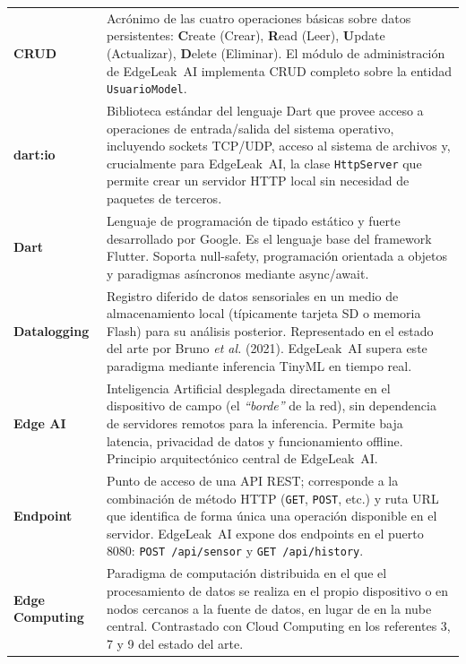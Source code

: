 \documentclass[12pt,a4paper]{article}
\begin{document}
\begin{longtable}{>{\bfseries}p{3.8cm} p{10.5cm}}
CRUD & Acrónimo de las cuatro operaciones básicas sobre datos persistentes:
\textbf{C}reate (Crear), \textbf{R}ead (Leer), \textbf{U}pdate (Actualizar),
\textbf{D}elete (Eliminar). El módulo de administración de EdgeLeak~AI implementa
CRUD completo sobre la entidad \texttt{UsuarioModel}.
\\[0.5em]

dart:io & Biblioteca estándar del lenguaje Dart que provee acceso a operaciones de
entrada/salida del sistema operativo, incluyendo sockets TCP/UDP, acceso al sistema de
archivos y, crucialmente para EdgeLeak~AI, la clase \texttt{HttpServer} que permite
crear un servidor HTTP local sin necesidad de paquetes de terceros.
\\[0.5em]

Dart & Lenguaje de programación de tipado estático y fuerte desarrollado por Google.
Es el lenguaje base del framework Flutter. Soporta null-safety, programación orientada
a objetos y paradigmas asíncronos mediante async/await.
\\[0.5em]

Datalogging & Registro diferido de datos sensoriales en un medio de almacenamiento local
(típicamente tarjeta SD o memoria Flash) para su análisis posterior. Representado en el
estado del arte por Bruno \textit{et al.} (2021). EdgeLeak~AI supera este paradigma
mediante inferencia TinyML en tiempo real.
\\[0.5em]

Edge AI & Inteligencia Artificial desplegada directamente en el dispositivo de campo
(el \textit{``borde''} de la red), sin dependencia de servidores remotos para la
inferencia. Permite baja latencia, privacidad de datos y funcionamiento offline.
Principio arquitectónico central de EdgeLeak~AI.
\\[0.5em]

Endpoint & Punto de acceso de una API REST; corresponde a la combinación de método
HTTP (\texttt{GET}, \texttt{POST}, etc.) y ruta URL que identifica de forma única una
operación disponible en el servidor. EdgeLeak~AI expone dos endpoints en el puerto 8080:
\texttt{POST /api/sensor} y \texttt{GET /api/history}.
\\[0.5em]

Edge Computing & Paradigma de computación distribuida en el que el procesamiento de datos
se realiza en el propio dispositivo o en nodos cercanos a la fuente de datos, en lugar
de en la nube central. Contrastado con Cloud Computing en los referentes 3, 7 y 9 del
estado del arte.
\\[0.5em]


\end{longtable}
\end{document}
